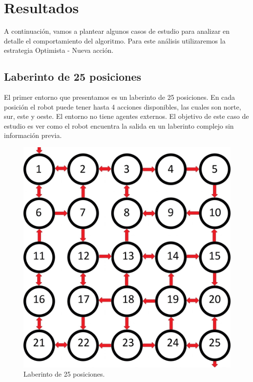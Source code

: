 \chapter{Resultados}

A continuación, vamos a plantear algunos casos de estudio para analizar en detalle el comportamiento del algoritmo. 
Para este análisis utilizaremos la estrategia Optimista - Nueva acción.

\section{Laberinto de 25 posiciones}

El primer entorno que presentamos es un laberinto de 25 posiciones. En cada posición el robot puede tener hasta 4 
acciones disponibles, las cuales son norte, sur, este y oeste. El entorno no tiene agentes externos. El objetivo de 
este caso de estudio es ver como el robot encuentra la salida en un laberinto complejo sin información previa.

\begin{figure}[H]
	\centering
		\includegraphics[scale=0.2]{Imagenes/Laberintos/25.jpg}
	\caption{Laberinto de 25 posiciones.}
	\label{fig:25}
\end{figure}

